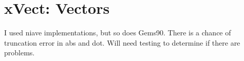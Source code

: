 \section{xVect: Vectors}
I used niave implementations, but so does Gems90.  There is a chance of
truncation error in abs and dot.   Will need testing to determine if there
are problems.
